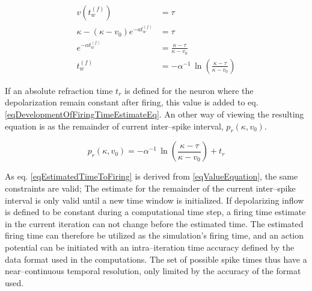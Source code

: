 	\begin{equation}
		\begin{split}
				v\left(t_w^{(f)}\right)			 							&= \tau \qquad 										\\	%
				\kappa - \left( \kappa - v_0 \right) e^{-at_w^{(f)}}  		&= \tau 											\\
				e^{-\alpha t_w^{(f)}} 			 						&= \frac{\kappa - \tau}{\kappa - v_0} 					\\
				t_w^{(f)}													&= -\alpha^{-1} \, \ln \left( \frac{\kappa - \tau}{\kappa - v_0} \right) 					
		\end{split}
		\label{eqDevelopmentOfFiringTimeEstimateEq}
	\end{equation}

	If an absolute refraction time $t_r$ is defined for the neuron where the depolarization remain constant after firing, this value is added to eq. \eqref{eqDevelopmentOfFiringTimeEstimateEq}.
	An other way of viewing the resulting equation is as the remainder of current inter--spike interval, $p_r(\kappa, v_0)$.

\begin{equation}
	p_r(\kappa, v_0)  	= -\alpha^{-1} \, \ln \left( \frac{\kappa - \tau}{\kappa - v_0} \right) + t_r
	\label{eqEstimatedTimeToFiring}
\end{equation}

	As eq. \eqref{eqEstimatedTimeToFiring} is derived from \eqref{eqValueEquation}, the same constraints are valid;
		The estimate for the remainder of the current inter--spike interval is only valid until a new time window is initialized.
	If depolarizing inflow is defined to be constant during a computational time step, a firing time estimate in the current iteration can not change before the estimated time. %
	The estimated firing time can therefore be utilized as the simulation's firing time, and an action potential can be initiated with an intra--iteration time accuracy defined by the data format used in the computations. %
	The set of possible spike times thus have a near--continuous temporal resolution, only limited by the accuracy of the format used. %

